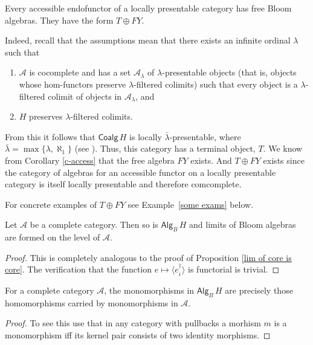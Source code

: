 \documentclass{LMCS}
\theoremstyle{plain}
\theoremstyle{definition}
\numberwithin{equation}{section}
\begin{document}
\begin{cor}\label{free B exists}
Every accessible endofunctor of a locally presentable category has free Bloom algebras. They have the form $T\oplus FY$.
\end{cor}

Indeed, recall that the assumptions mean that there exists an infinite ordinal $\lambda$ such that
\begin{enumerate}[label=\({\alph*}]
\item  $\mathcal A$ is cocomplete and has a set $\mathcal A_\lambda$
  of $\lambda$-presentable objects (that is, objects whose
  hom-functors preserve $\lambda$-filtered colimits) such that every
  object is a $\lambda$-filtered colimit of objects in $\mathcal
  A_\lambda$, and

\item $H$ preserves $\lambda$-filtered colimits.
\end{enumerate}

From this it follows that $\mathsf{Coalg}\, H$ is locally
$\bar\lambda$-presentable, where $\bar\lambda = \max\{\lambda,
\aleph_1\}$ (see \cite{ap}). Thus, this category  has a terminal object, $T$.
We know from Corollary \ref{c-access} that the free algebra $FY$
exists. And $T \oplus FY$ exists since the category of algebras for an
accessible functor on a locally presentable category is itself locally
presentable and therefore comcomplete. 


\begin{rem}
For concrete examples of $T\oplus FY$ see Example~\ref{some exams} below.
\end{rem}

\begin{prop}\label{lim of B is B}
Let $\mathcal A$ be a complete category. Then so is $\mathsf{Alg}_B\, H$ and limits of Bloom algebras are formed on the level of $\mathcal A$.
\end{prop}
\begin{proof}
This is completely analogous to the proof of Proposition \ref{lim of core is core}. The verification that the function $e\mapsto \langle e^\dagger_i\rangle$ is functorial is trivial.
\end{proof}

\begin{cor}\label{cor:mono}
  For a complete category $\mathcal A$, the monomorphisms in $\mathsf{Alg}_B\, H$ are precisely those homomorphisms carried by monomorphisms in $\mathcal A$. 
\end{cor}
\begin{proof}
  To see this use that in any category with pullbacks a morhism $m$ is a monomorphism iff its kernel pair consists of two identity morphisms. 
\end{proof}
\end{document}
